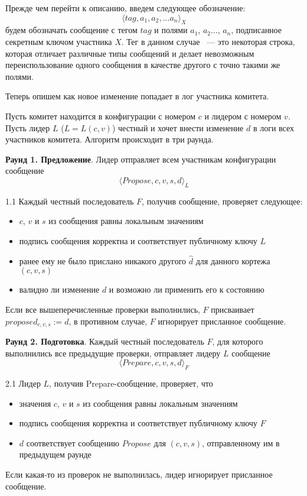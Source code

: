 Прежде чем перейти к описанию, введем следующее обозначение:
\[ \langle tag, a_1, a_2, ... a_n \rangle_X \] будем обозначать сообщение с тегом $tag$ и полями $a_1$, $a_2$..., $a_n$, подписанное секретным ключом участника $X$. Тег в данном случае ~--- это некоторая строка, которая отличает различные типы сообщений и делает невозможным переиспользование одного сообщения в качестве другого с точно такими же полями.

Теперь опишем как новое изменение попадает в лог участника комитета.

Пусть комитет находится в конфигурации с номером $c$ и лидером с номером $v$. 
Пусть лидер $L$ ($L = L(c, v)$) честный и хочет внести изменение $d$ в логи всех участников комитета. Алгоритм происходит в три раунда.

\textbf{Раунд 1. Предложение}. Лидер отправляет всем участникам конфигурации сообщение 
\[ \langle Propose, c, v, s, d \rangle_L \]

1.1 Каждый честный последователь $F$, получив сообщение, проверяет следующее:
\begin{itemize}
\item $c$, $v$ и $s$ из сообщения равны локальным значениям
\item подпись сообщения корректна и соответствует публичному ключу $L$
\item ранее ему не было прислано никакого другого $\hat d$ для данного кортежа $(c, v, s)$
\item валидно ли изменение $d$ и возможно ли применить его к состоянию
\end{itemize}

Если все вышеперечисленные проверки выполнились, $F$ присваивает $proposed_{c,v,s} := d$, в противном случае, $F$ игнорирует присланное сообщение. 
\vspace{10pt}

\textbf{Раунд 2. Подготовка}. Каждый честный последователь $F$, для которого выполнились все предыдущие проверки, отправляет лидеру $L$ сообщение 
\[ \langle Prepare, c, v, s, d \rangle_F \]

2.1 Лидер $L$, получив Prepare-сообщение, проверяет, что
\begin{itemize}
\item значения $c$, $v$ и $s$ из сообщения равны локальным значениям
\item подпись сообщения корректна и соответствует публичному ключу $F$
\item $d$ соответствует сообщению $Propose$ для $(c, v, s)$, отправленному им в предыдущем раунде
\end{itemize}
Если какая-то из проверок не выполнилась, лидер игнорирует присланное сообщение. 

